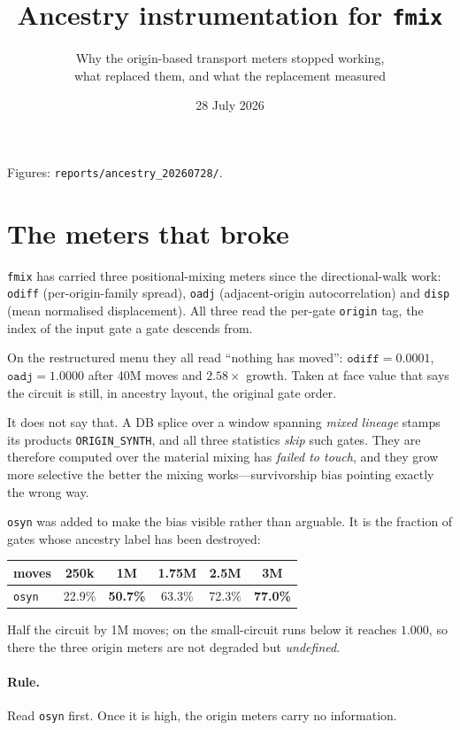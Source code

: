 \documentclass[11pt]{article}
\title{Ancestry instrumentation for \texttt{fmix}}
\author{Why the origin-based transport meters stopped working,\\
what replaced them, and what the replacement measured}
\date{28 July 2026}
\begin{document}
\maketitle

\noindent Figures: \texttt{reports/ancestry\_20260728/}.

\section{The meters that broke}

\texttt{fmix} has carried three positional-mixing meters since the
directional-walk work: \texttt{odiff} (per-origin-family spread), \texttt{oadj}
(adjacent-origin autocorrelation) and \texttt{disp} (mean normalised
displacement). All three read the per-gate \texttt{origin} tag, the index of the
input gate a gate descends from.

On the restructured menu they all read ``nothing has moved'':
$\texttt{odiff}=0.0001$, $\texttt{oadj}=1.0000$ after 40M moves and
$2.58\times$ growth. Taken at face value that says the circuit is still, in
ancestry layout, the original gate order.

It does not say that. A DB splice over a window spanning \emph{mixed lineage}
stamps its products \texttt{ORIGIN\_SYNTH}, and all three statistics
\emph{skip} such gates. They are therefore computed over the material mixing has
\emph{failed to touch}, and they grow more selective the better the mixing
works---survivorship bias pointing exactly the wrong way.

\texttt{osyn} was added to make the bias visible rather than arguable. It is the
fraction of gates whose ancestry label has been destroyed:

\begin{center}
\begin{tabular}{lccccc}
\toprule
moves & 250k & 1M & 1.75M & 2.5M & 3M \\
\midrule
\texttt{osyn} & 22.9\% & \textbf{50.7\%} & 63.3\% & 72.3\% & \textbf{77.0\%} \\
\bottomrule
\end{tabular}
\end{center}

Half the circuit by 1M moves; on the small-circuit runs below it reaches
$1.000$, so there the three origin meters are not degraded but \emph{undefined}.

\paragraph{Rule.} Read \texttt{osyn} first. Once it is high, the origin meters
carry no information.
\end{document}
